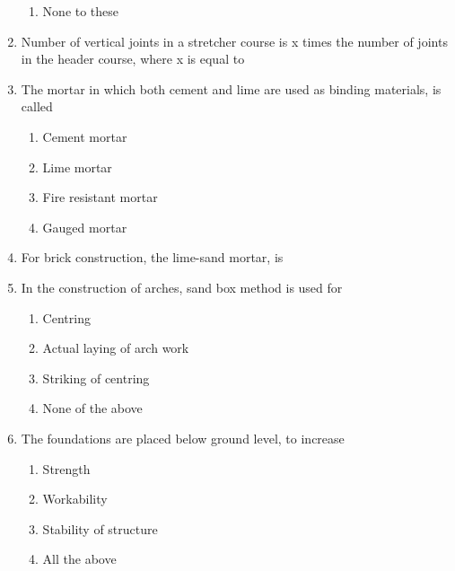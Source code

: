 \documentclass[11pt,a4paper]{article}
\begin{document}
\begin{enumerate}
\begin{enumerate}[label=\Alph*.]
\item{None to these}
\end{enumerate}
\item{Number of vertical joints in a stretcher course is x times the number of joints in the header course, where x is equal to}
\\
\item{The mortar in which both cement and lime are used as binding materials, is called}
\begin{enumerate}[label=\Alph*.]
\item{Cement mortar}
\item{Lime mortar}
\item{Fire resistant mortar}
\item{Gauged mortar}
\end{enumerate}
\item{For brick construction, the lime-sand mortar, is}
\\
\item{In the construction of arches, sand box method is used for}
\begin{enumerate}[label=\Alph*.]
\item{Centring}
\item{Actual laying of arch work}
\item{Striking of centring}
\item{None of the above}
\end{enumerate}
\item{The foundations are placed below ground level, to increase}
\begin{enumerate}[label=\Alph*.]
\item{Strength}
\item{Workability}
\item{Stability of structure}
\item{All the above}

\end{enumerate}
\end{enumerate}
\end{document}

